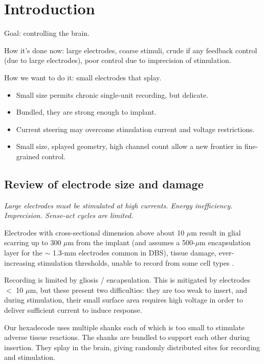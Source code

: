 \documentclass[10pt,letterpaper]{article}
\begin{document}
\linenumbers

\section{Introduction}

Goal: controlling the brain.

How it's done now: large electrodes, coarse stimuli, crude if any feedback control (due to large electrodes), poor control due to imprecision of stimulation.

How we want to do it: small electrodes that splay.
\begin{itemize}
\item Small size permits chronic single-unit recording, but delicate.
\item Bundled, they are strong enough to implant.
\item Current steering may overcome stimulation current and voltage restrictions.
\item Small size, splayed geometry, high channel count allow a new frontier in fine-grained control.
\end{itemize}


\subsection{Review of electrode size and damage}

{\em Large electrodes must be stimulated at high currents.  Energy inefficiency.  Imprecision.  Sense-act cycles are limited.}

Electrodes with cross-sectional dimension above about 10 $\mu$m result in glial scarring up to 300 $\mu$m from the implant (and \cite{Butson2008steering} assumes a 500-$\mu$m encapsulation layer for the $\sim$ 1.3-mm electrodes common in DBS), tissue damage, ever-increasing stimulation thresholds, unable to record from some cell types \cite{Biran2005gliosis,Polikov2005gliosis,Winslow2010gliosis}. 

Recording is limited by gliosis / encapsulation.  This is mitigated by electrodes $<$ 10 $\mu$m, but these present two difficulties: they are too weak to insert, and during stimulation, their small surface area requires high voltage in order to deliver sufficient current to induce response.

Our hexadecode \cite{Guitchounts2013electrode} uses multiple shanks each of which is too small to stimulate adverse tissue reactions.  The shanks are bundled to support each other during insertion.  They splay in the brain, giving randomly distributed sites for recording and stimulation.
\end{document}
